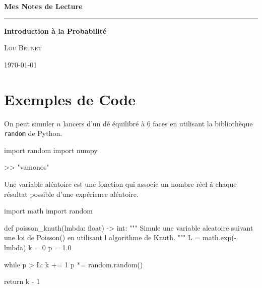 \documentclass{article}
\renewcommand{\maketitle}{%
\begin{titlepage}
\centering
\vspace*{\stretch{1.5}}
{\Huge \bfseries Mes Notes de Lecture\par}
\vspace{0.4cm}
\rule{0.8\linewidth}{0.4pt}
\vspace{1cm}
{\LARGE \bfseries Introduction à la Probabilité\par}
\vspace*{\stretch{2.5}}
{\Large \scshape Lou Brunet\par}
\vspace{0.5cm}
{\large \today\par}
\vspace*{\stretch{1}}
\end{titlepage}
}
\begin{document}
\maketitle

\newpage
\tableofcontents 
\newpage












\section{Exemples de Code}

\begin{examplebox}
On peut simuler $n$ lancers d'un dé équilibré à 6 faces en utilisant la bibliothèque \texttt{random} de Python.

\begin{codecell}
import random
import numpy
\end{codecell}

\begin{outputcell}
>> "vamonos"
\end{outputcell}

\end{examplebox}

\begin{definitionbox}
Une variable aléatoire est une fonction qui associe un nombre réel à chaque résultat possible d'une expérience aléatoire.
\end{definitionbox}

\begin{codecell}
import math
import random

def poisson_knuth(lmbda: float) -> int:
  """
  Simule une variable aleatoire suivant une loi de Poisson()
  en utilisant l algorithme de Knuth.
  """
  L = math.exp(-lmbda)
  k = 0
  p = 1.0

  while p > L:
  k += 1
  p *= random.random()

  return k - 1
\end{codecell}
\end{document}
